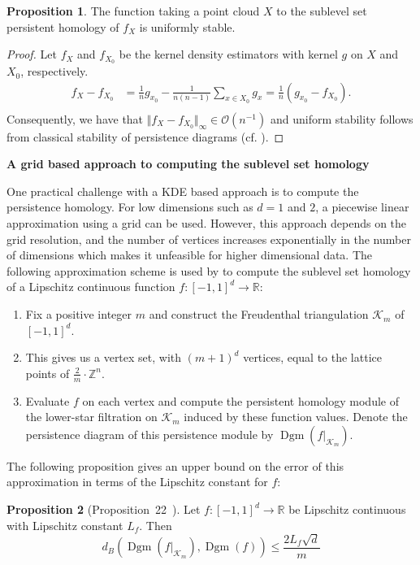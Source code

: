 \documentclass[10pt,a4paper]{article}
\theoremstyle{definition}
\newtheorem{prop}{Proposition}[thm]
\newcommand{\R}{\mathbb{R}}
\begin{document}
\begin{prop}
	The function taking a point cloud $X$ to the sublevel set persistent homology of $f_X$ is uniformly stable.
\end{prop}
\begin{proof}
	Let $f_X$ and $f_{X_0}$ be the kernel density estimators with kernel $g$ on $X$ and $X_0$, respectively.
	\begin{align*}
		f_X - f_{X_0} &= \frac{1}{n}g_{x_0} -\frac{1}{n(n-1)}\sum_{x\in X_0}g_x
		= \frac{1}{n}\left(g_{x_0} - f_{X_0}\right). \\
	\end{align*}
	Consequently, we have that $\Vert f_X - f_{X_0}\Vert_\infty\in\mathcal{O}(n^{-1})$ and uniform stability follows from classical stability of persistence diagrams (cf. \autocite{cohen2005stability}).
\end{proof}

\textbf{A grid based approach to computing the sublevel set homology}

One practical challenge with a KDE based approach is to compute the persistence homology. For low dimensions such as $d=1$ and $2$, a piecewise linear approximation using a grid can be used. However, this approach depends on the grid resolution, and the number of vertices increases exponentially in the number of dimensions which makes it unfeasible for higher dimensional data. The following approximation scheme is used by \autocite{Hoefgeest2022} to compute the sublevel set homology of a Lipschitz continuous function $f\colon[-1,1]^d\to\R$:
\begin{enumerate}
	\item Fix a positive integer $m$ and construct the Freudenthal triangulation $\mathcal{K}_m$ of $[-1,1]^d$.
	\item This gives us a vertex set, with $(m+1)^d$ vertices, equal to the lattice points of $\frac{2}{m}\cdot\mathbb{Z}^n$.
	\item Evaluate $f$ on each vertex and compute the persistent homology module of the lower-star filtration on $\mathcal{K}_m$ induced by these function values. Denote the persistence diagram of this persistence module by $\operatorname{Dgm}(f\vert_{\mathcal{K}_m})$.
\end{enumerate}
The following proposition gives an upper bound on the error of this approximation in terms of the Lipschitz constant for $f$:
\begin{prop}[Proposition~22~\autocite{Hoefgeest2022}]
	Let $f\colon[-1,1]^d\to\R$ be Lipschitz continuous with Lipschitz constant $L_f$. Then
	$$
	d_B\left(\operatorname{Dgm}(f\vert_{\mathcal{K}_m}), \operatorname{Dgm}(f)\right)\leq \frac{2L_f\sqrt{d}}{m}
	$$
\end{prop}
\end{document}
